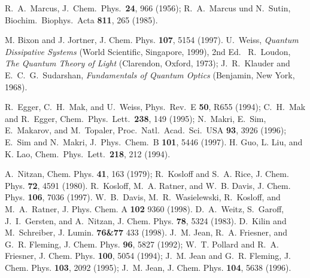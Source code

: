 \documentclass[12pt,twoside,a4paper]{report}
\begin{document}
{\begin{thebibliography}{999}
 R.~A.~Marcus, J.\ Chem.\ Phys.\, {\bf 24}, 966 (1956); 
                 R.~A.~Marcus und N.~Sutin, Biochim.\ Biophys.\ Acta {\bf 811}, 265 (1985).  

         M. Bixon and J. Jortner,  J. Chem. Phys. {\bf 107}, 5154 (1997).
      U.~Weiss, {\it Quantum Dissipative Systems} (World
                      Scientific, Singapore, 1999), 2nd Ed.\
      R.~Loudon, {\it The Quantum Theory of Light}
                  (Clarendon, Oxford, 1973);
                  J.~R.~Klauder and E.~C.~G.~Sudarshan, {\it Fundamentals of Quantum Optics} 
                  (Benjamin, New York, 1968).

         R.~Egger, C.~H.~Mak, and U.~Weiss, Phys.\ Rev.\ E {\bf 50},
                      R655 (1994); C.~H.~Mak and R.~Egger, Chem.\ Phys.\ Lett.\ {\bf 238}, 149
                      (1995); N.~Makri, E.~Sim, E.~Makarov, and M.~Topaler, Proc.\ Natl.\ Acad.\ 
                      Sci.\ USA {\bf 93}, 3926 (1996); E.~Sim and N.~Makri, J.\ Phys.\ Chem.\ B
                      {\bf 101}, 5446 (1997).
\bibitem{guo94}       H. Guo, L. Liu, and K. Lao, Chem.\ Phys.\ Lett.\ {\bf 218}, 212 (1994).

\bibitem{m11-n1}  A.~Nitzan, { Chem. Phys.}  {\bf 41}, 163 (1979);
                  R.~Kosloff and S.~A. Rice, 
                  {J. Chem. Phys.}  {\bf 72}, 4591 (1980).
\bibitem{k5}      R.~Kosloff, M.~A. Ratner, and W.~B. Davis, 
                  {J. Chem. Phys.}  {\bf 106}, 7036 (1997).  
\bibitem{dav98a}  W.~B.~Davis, M.~R.~Wasielewski, R.~Kosloff, and M.~A.~Ratner,
                  {J. Phys. Chem. A} {\bf 102} 9360 (1998).
\bibitem{w4}      D.~A.~Weitz, S.~Garoff, J.~I.~Gersten, and A.~Nitzan, {  J. Chem. Phys.}  {\bf 78}, 5324 (1983).
\bibitem{k9}      D.~Kilin and M.~Schreiber, {  J.  Lumin.} {\bf 76\&77} 433 (1998).
\bibitem{j3}      J.~M. Jean, R.~A. Friesner, and G.~R. Fleming, 
                  { J. Chem. Phys.}  {\bf  96}, 5827 (1992);
                  W.~T. Pollard and R.~A. Friesner, 
                  { J. Chem. Phys.}  {\bf 100}, 5054 (1994);
                  J.~M. Jean and G.~R. Fleming, 
                  { J. Chem. Phys.}  {\bf 103}, 2092 (1995);
                  J.~M. Jean, { J. Chem. Phys.}  {\bf 104}, 5638 (1996).


\end{thebibliography}}
\end{document}
